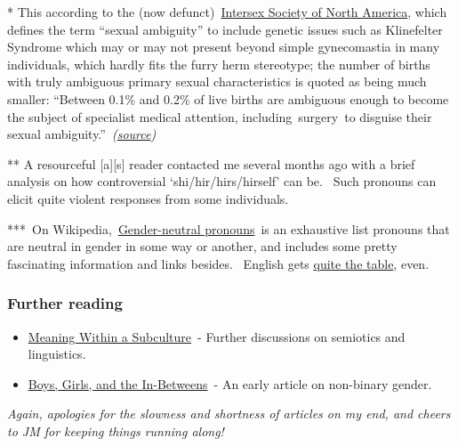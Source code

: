 * This according to the (now
defunct)~\href{http://en.wikipedia.org/wiki/Intersex_Society_of_North_America}{Intersex
Society of North America}, which defines the term ``sexual ambiguity''
to include genetic issues such as Klinefelter Syndrome which may or may
not present beyond simple gynecomastia in many individuals, which hardly
fits the furry herm stereotype; the number of births with truly
ambiguous primary sexual characteristics is quoted as being much
smaller: ``Between 0.1\% and 0.2\% of live births are ambiguous enough
to become the subject of specialist medical attention,
including~surgery~to disguise their sexual
ambiguity.''~\emph{(\href{http://en.wikipedia.org/wiki/Intersex\#Other_possible_intersex_conditions_and_scope}{source})}

** A resourceful {[}a{]}{[}s{]} reader contacted me several months ago
with a brief analysis on how controversial `shi/hir/hirs/hirself' can
be. ~Such pronouns can elicit quite violent responses from some
individuals.

***~On
Wikipedia,~\href{http://en.wikipedia.org/wiki/Gender-neutral_pronoun}{Gender-neutral
pronouns}~is an exhaustive list pronouns that are neutral in gender in
some way or another, and includes some pretty fascinating information
and links besides. ~English gets
\href{http://en.wikipedia.org/wiki/Gender-neutral_pronoun\#Summary}{quite
the table}, even.

\subsubsection{Further reading}\label{further-reading}

\begin{itemize}
\tightlist
\item
  \href{http://adjectivespecies.com/meaning-within-a-subculture/}{Meaning
  Within a Subculture}~- Further discussions on semiotics and
  linguistics.\\
\item
  \href{http://adjectivespecies.com/2011/11/16/boys-girls-and-the-in-betweens/}{Boys,
  Girls, and the In-Betweens}~- An early article on non-binary gender.
\end{itemize}

\emph{Again, apologies for the slowness and shortness of articles on my
end, and cheers to JM for keeping things running along!}
